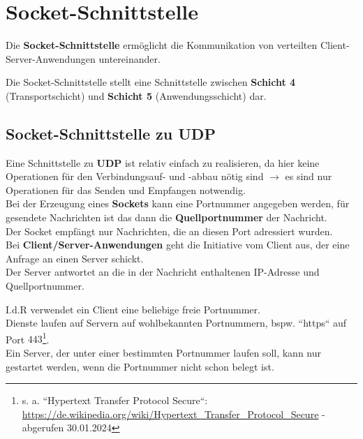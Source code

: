 \section{Socket-Schnittstelle}

Die \textbf{Socket-Schnittstelle} ermöglicht die Kommunikation von verteilten Client-Server-Anwendungen untereinander.

\begin{tcolorbox}[enlarge top by=0.5cm,enlarge bottom by=0.5cm]
Die Socket-Schnittstelle stellt eine Schnittstelle zwischen \textbf{Schicht 4} (Transportschicht) und \textbf{Schicht 5} (Anwendungsschicht) dar.
\end{tcolorbox}

\subsection{Socket-Schnittstelle zu UDP}

Eine Schnittstelle zu \textbf{UDP} ist relativ einfach zu realisieren, da hier keine Operationen für den Verbindungsauf- und -abbau nötig sind $\rightarrow$ es sind nur Operationen für das Senden und Empfangen notwendig.\\

\noindent
Bei der Erzeugung eines \textbf{Sockets} kann eine Portnummer angegeben werden, für gesendete Nachrichten ist das dann die \textbf{Quellportnummer} der Nachricht.\\
Der Socket empfängt nur Nachrichten, die an diesen Port adressiert wurden.\\

\noindent
Bei \textbf{Client/Server-Anwendungen} geht die Initiative vom Client aus, der eine Anfrage an einen Server schickt.\\
Der Server antwortet an die in der Nachricht enthaltenen IP-Adresse und Quellportnummer.


I.d.R verwendet ein Client eine beliebige freie Portnummer.\\

\noindent
Dienste laufen auf Servern auf wohlbekannten Portnummern, bspw. ``https`` auf Port $443$\footnote{
s. a. ``Hypertext Transfer Protocol Secure``: \url{https://de.wikipedia.org/wiki/Hypertext_Transfer_Protocol_Secure} - abgerufen 30.01.2024
}.\\
Ein Server, der unter einer bestimmten Portnummer laufen soll, kann nur gestartet werden, wenn die Portnummer nicht schon belegt ist.

